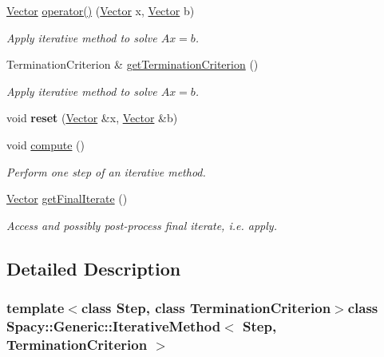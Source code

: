 \begin{DoxyCompactItemize}
\item 
\hyperlink{classSpacy_1_1Generic_1_1Vector}{\-Vector} \hyperlink{classSpacy_1_1Generic_1_1IterativeMethod_a87278a2b0ef67d35c3bd000415efec6a}{operator()} (\hyperlink{classSpacy_1_1Generic_1_1Vector}{\-Vector} x, \hyperlink{classSpacy_1_1Generic_1_1Vector}{\-Vector} b)
\begin{DoxyCompactList}\small\item\em \-Apply iterative method to solve $Ax=b$. \end{DoxyCompactList}\item 
\-Termination\-Criterion \& \hyperlink{classSpacy_1_1Generic_1_1IterativeMethod_a9e112dd05cb8a45a28dc601a2aff6105}{get\-Termination\-Criterion} ()
\begin{DoxyCompactList}\small\item\em \-Apply iterative method to solve $Ax=b$. \end{DoxyCompactList}\item 
\hypertarget{classSpacy_1_1Generic_1_1Step_a9369b492a0e8233de616a8a08415f92e}{void {\bfseries reset} (\hyperlink{classSpacy_1_1Generic_1_1Vector}{\-Vector} \&x, \hyperlink{classSpacy_1_1Generic_1_1Vector}{\-Vector} \&b)}\label{classSpacy_1_1Generic_1_1Step_a9369b492a0e8233de616a8a08415f92e}

\item 
void \hyperlink{classSpacy_1_1Generic_1_1Step_ac400c25a81a5138b4926bbb99692b343}{compute} ()
\begin{DoxyCompactList}\small\item\em \-Perform one step of an iterative method. \end{DoxyCompactList}\item 
\hyperlink{classSpacy_1_1Generic_1_1Vector}{\-Vector} \hyperlink{classSpacy_1_1Generic_1_1Step_a5be9a8afa47319b645b2df73b3b23acc}{get\-Final\-Iterate} ()
\begin{DoxyCompactList}\small\item\em \-Access and possibly post-\/process final iterate, i.\-e. apply. \end{DoxyCompactList}\end{DoxyCompactItemize}


\subsection{\-Detailed \-Description}
\subsubsection*{template$<$class Step, class Termination\-Criterion$>$class Spacy\-::\-Generic\-::\-Iterative\-Method$<$ Step, Termination\-Criterion $>$}

